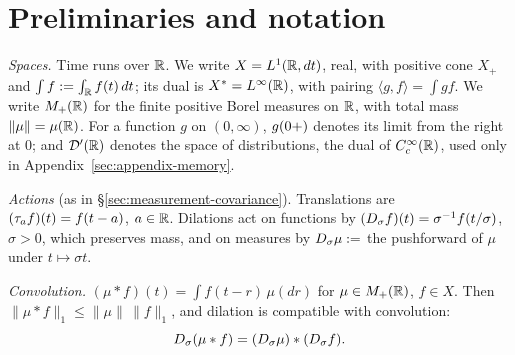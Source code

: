 %

\section{Preliminaries and notation}\label{sec:preliminaries}

\emph{Spaces.} Time runs over $\mathbb{R}$. We write $X = L^1(\mathbb{R}, dt)$, real, with positive cone $X_+$
and $\int f := \int_{\mathbb{R}} f(t)\,dt$; its dual is $X^* = L^\infty(\mathbb{R})$, with pairing
$\langle g, f\rangle = \int g f$. We write $M_+(\mathbb{R})$ for the finite positive Borel
measures on $\mathbb{R}$, with total mass $\|\mu\| = \mu(\mathbb{R})$. For a function $g$ on $(0,\infty)$,
$g(0{+})$ denotes its limit from the right at $0$; and $\mathcal{D}'(\mathbb{R})$ denotes the space of
distributions, the dual of $C_c^\infty(\mathbb{R})$, used only in Appendix~\ref{sec:appendix-memory}.

\emph{Actions} (as in \S\ref{sec:measurement-covariance}). Translations are
$(\tau_a f)(t) = f(t-a)$, $a \in \mathbb{R}$. Dilations act on
functions by $(D_\sigma f)(t) = \sigma^{-1} f(t/\sigma)$, $\sigma > 0$, which preserves
mass, and on measures by $D_\sigma \mu :=$ the pushforward of $\mu$ under
$t \mapsto \sigma t$.

\emph{Convolution.} $(\mu * f)(t) = \int f(t - r)\,\mu(dr)$ for $\mu \in M_+(\mathbb{R})$,
$f \in X$. Then $\|\mu * f\|_1 \le \|\mu\|\,\|f\|_1$, and dilation is compatible with
convolution:
\[
  D_\sigma(\mu * f) = (D_\sigma \mu) * (D_\sigma f).
\]

